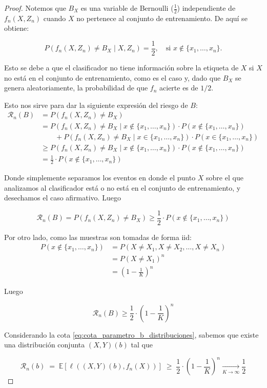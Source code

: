 \documentclass{report}
\begin{document}
\begin{proof}
Notemos que \(B_X\) es una variable de Bernoulli (\(\frac{1}{2}\)) independiente de \(f_n(X, Z_n)\) cuando
\(X\) no pertenece al conjunto de entrenamiento. De aquí se obtiene:

\[
P(f_n(X, Z_n) \neq B_X \mid X, Z_n) = \frac{1}{2}, \quad \text{si } x \notin \{x_1, \dots, x_n\}.
\]

Esto se debe a que el clasificador no tiene información sobre la etiqueta de \(X\) si \(X\) no está en el conjunto de entrenamiento,
como es el caso y, dado que $B_X$ se genera aleatoriamente, la probabilidad de que $f_n$ acierte es de $1/2$.

Esto nos sirve para
dar la siguiente expresión del riesgo de $B$:
\begin{equation*}
    \begin{aligned}
        \mathcal{R}_n(B) &= P(f_n(X, Z_n) \neq B_X)\\
        &= P(f_n(X, Z_n) \neq B_X \mid x \notin \{x_1, \dots, x_n\}) \cdot P(x \notin \{x_1, \dots, x_n\})\\
        &  \qquad + P(f_n(X, Z_n) \neq B_X \mid x \in \{x_1, \dots, x_n\}) \cdot P(x \in \{x_1, \dots, x_n\})\\
        &\geq P(f_n(X, Z_n) \neq B_X \mid x \notin \{x_1, \dots, x_n\}) \cdot P(x \notin \{x_1, \dots, x_n\})\\
        & = \frac{1}{2} \cdot P(x \notin \{x_1, \dots, x_n\})
    \end{aligned}
\end{equation*}

Donde simplemente separamos los eventos en donde el punto $X$ sobre el que analizamos al clasificador está o no está
en el conjunto de entrenamiento, y desechamos el caso afirmativo. Luego

\[
\mathcal{R}_n(B) = P(f_n(X, Z_n) \neq B_X) \geq \frac{1}{2} \cdot P(x \notin \{x_1, \dots, x_n\})
\]

Por otro lado, como las muestras son tomadas de forma iid:
\[
\begin{aligned}
    P(x \notin \{x_1, \dots, x_n\}) &= P(X\neq X_1, X\neq X_2, \dots, X\neq X_n) \\
   &= P(X\neq X_1)^n \\
   &= \left(1-\frac{1}{K}\right)^n
\end{aligned}
\]

Luego

\[
\mathcal{R}_n(B) \geq \frac{1}{2} \cdot \left(1-\frac{1}{K}\right)^n
\]

Considerando la cota \ref{eq:cota_parametro_b_distribuciones}, sabemos que existe una distribución
conjunta $(X,Y)(b)$ tal que

\[
\mathcal{R}_n(b) \; =\; \mathbb{E}[\ell((X,Y)(b),f_n(X))] \; \geq \;  \frac{1}{2} \cdot \left(1-\frac{1}{K}\right)^n \xrightarrow[K \to \infty]{} \frac{1}{2}
\]


\end{proof}
\end{document}

